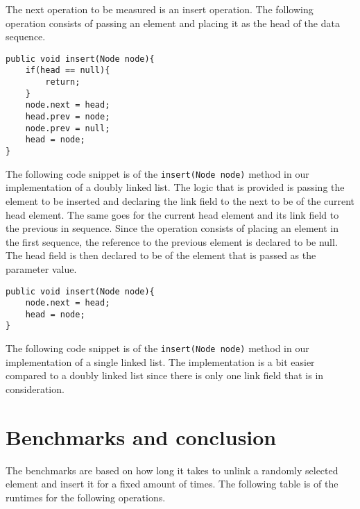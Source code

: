 \documentclass[a4paper,11pt]{article}
\begin{document}
        The next operation to be measured is an insert operation. The following operation consists of passing an element and placing it as the head of the data sequence.
\begin{verbatim}
public void insert(Node node){
    if(head == null){
        return;
    }
    node.next = head;
    head.prev = node;
    node.prev = null;
    head = node;
}
\end{verbatim}
        The following code snippet is of the \texttt{insert(Node node)} method in our implementation of a doubly linked list. The logic that is provided is passing the element to be inserted and declaring the link field to the next to be of the current head element. The same goes for the current head element and its link field to the previous in sequence. Since the operation consists of placing an element in the first sequence, the reference to the previous element is declared to be null. The head field is then declared to be of the element that is passed as the parameter value.
\begin{verbatim}
public void insert(Node node){
    node.next = head;
    head = node;
}
\end{verbatim}
        The following code snippet is of the \texttt{insert(Node node)} method in our implementation of a single linked list. The implementation is a bit easier compared to a doubly linked list since there is only one link field that is in consideration.
        
\section*{Benchmarks and conclusion}

    The benchmarks are based on how long it takes to unlink a randomly selected element and insert it for a fixed amount of times. The following table is of the runtimes for the following operations.
\end{document}

